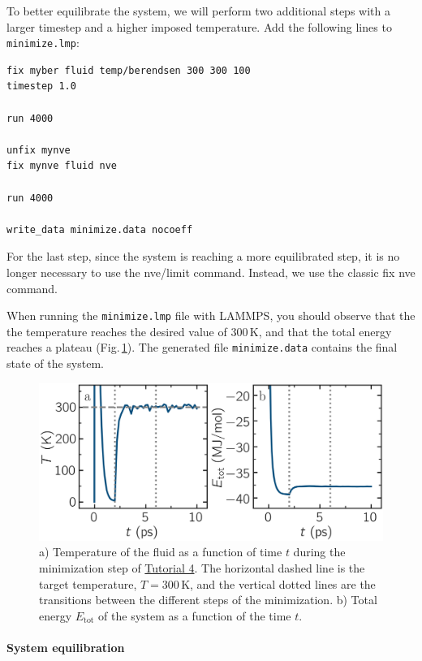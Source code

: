 \documentclass[9pt,tutorial]{livecoms}
\newcommand{\lmpcmd}[1]{\hspace{0pt}\colorbox{listing}{\textcolor{command}{\small{#1}}}\hspace{0pt}} %
\newcommand{\flecmd}[1]{\textcolor{command}{\texttt{#1}}} %
\begin{document}
To better equilibrate the system, we will perform two additional steps
with a larger timestep and a higher imposed temperature.  Add the following lines
to \flecmd{minimize.lmp}:
\begin{lstlisting}
fix myber fluid temp/berendsen 300 300 100
timestep 1.0

run 4000

unfix mynve
fix mynve fluid nve

run 4000

write_data minimize.data nocoeff
\end{lstlisting}
For the last step, since the system is reaching a more
equilibrated step, it is no longer necessary to use the \lmpcmd{nve/limit} command.
Instead, we use the classic \lmpcmd{fix nve} command.

When running the \flecmd{minimize.lmp} file with LAMMPS, you should observe that the
the temperature reaches the desired value of $300\,\text{K}$, and that the total
energy reaches a plateau (Fig.\,\ref{fig:NANOSHEAR-minimization}).  The generated file
\flecmd{minimize.data} contains the final state of the system.

\begin{figure}
\centering
\includegraphics[width=\linewidth]{NANOSHEAR-minimization}
\caption{a) Temperature of the fluid as a function of time $t$ during the
minimization step of \hyperref[sheared-confined-label]{Tutorial 4}.
The horizontal dashed line is the target temperature, $T = 300$\,K, and the
vertical dotted lines are the transitions between the different steps
of the minimization.  b) Total
energy $E_\text{tot}$ of the system as a function of the time $t$.}
\label{fig:NANOSHEAR-minimization}
\end{figure}

\paragraph{System equilibration}
\end{document}
